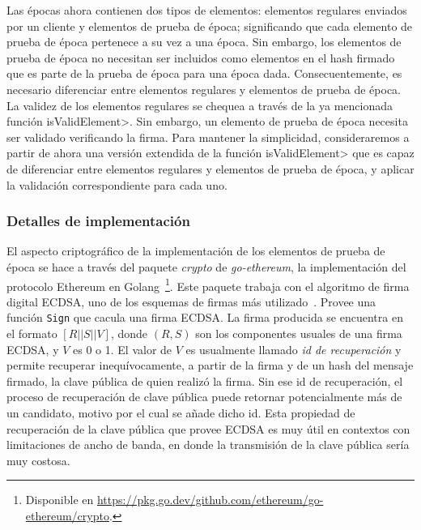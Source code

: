 Las épocas ahora contienen dos tipos de elementos: elementos regulares enviados por
un cliente y elementos de prueba de época; significando que cada elemento de prueba de época
pertenece a su vez a una época. Sin embargo, los elementos de prueba de época no necesitan ser
incluidos como elementos en el hash firmado que es parte de la prueba de época para una época
dada.
%
Consecuentemente, es necesario diferenciar entre elementos regulares y elementos de prueba de época.
%
La validez de los elementos regulares se chequea a través de la ya mencionada función
\<isValidElement>.
%
Sin embargo, un elemento de prueba de época necesita ser validado verificando la firma.
%
Para mantener la simplicidad, consideraremos a partir de ahora una versión extendida de la función
\<isValidElement> que es capaz de diferenciar entre elementos regulares y elementos de prueba de época,
y aplicar la validación correspondiente para cada uno.

\subsubsection{Detalles de implementación}

El aspecto criptográfico de la implementación de los elementos de prueba de época se
hace a través del paquete \textit{crypto} de \textit{go-ethereum}, la implementación
del protocolo Ethereum en Golang~\footnote{Disponible en \url{https://pkg.go.dev/github.com/ethereum/go-ethereum/crypto}.}.
%
Este paquete trabaja con el algoritmo de firma digital ECDSA, uno de los esquemas de firmas más
utilizado~\cite{real.world.crypto}.
%
Provee una función \texttt{Sign} que cacula una firma ECDSA.
%
La firma producida se encuentra en el formato $[R || S || V]$, donde $(R, S)$ son los componentes usuales
de una firma ECDSA, y $V$ es 0 o 1.
%
El valor de $V$ es usualmente llamado \textit{id de recuperación} y permite recuperar inequívocamente,
a partir de la firma y de un hash del mensaje firmado, la clave pública de quien realizó la firma.
%
Sin ese id de recuperación, el proceso de recuperación de clave pública puede retornar potencialmente
más de un candidato, motivo por el cual se añade dicho id.
% 
Esta propiedad de recuperación de la clave pública que provee ECDSA es muy útil en contextos con limitaciones
de ancho de banda, en donde la transmisión de la clave pública sería muy costosa.

